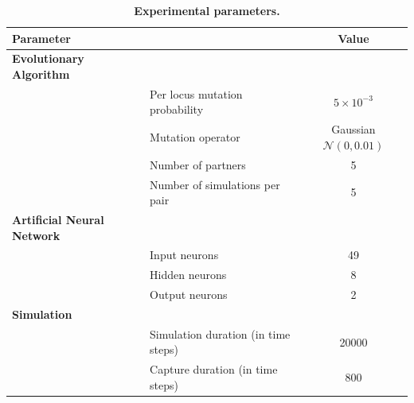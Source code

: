     \begin{table}[ht]
      \centerfloat
        \begin{tabular}{|l|l|c|}
          \hline
          \multicolumn{2}{|l|}{\textbf{Parameter}} & \textbf{Value} \\
          \hline
          \textbf{Evolutionary Algorithm} & & \\
          \hline
          & Per locus mutation probability & \(5 \times 10^{-3}\) \\
          \hline
          & Mutation operator & Gaussian \(\mathcal{N}(0, 0.01)\) \\
          \hline
          & Number of partners & 5 \\
          \hline
          & Number of simulations per pair & 5 \\
          \hline

          \textbf{Artificial Neural Network} & & \\
          \hline
          & Input neurons & 49 \\
          \hline
          & Hidden neurons & 8 \\
          \hline
          & Output neurons & 2 \\
          \hline

          \textbf{Simulation} & & \\
          \hline
          & Simulation duration (in time steps) & 20000 \\
          \hline
          & Capture duration (in time steps) & 800 \\
          \hline
        \end{tabular}
        \caption{\textbf{Experimental parameters.}}
      \label{table:tableParameters}
    \end{table}


